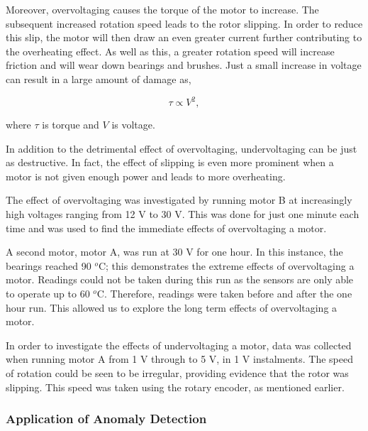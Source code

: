 Moreover, overvoltaging causes the torque of the motor to increase. The subsequent increased rotation speed leads to the rotor slipping. In order to reduce this slip, the motor will then draw an even greater current further contributing to the overheating effect. As well as this, a greater rotation speed will increase friction and will wear down bearings and brushes. Just a small increase in voltage can result in a large amount of damage as,

\begin{equation}
\tau \propto V^2,
\label{Torque}
\end{equation}

where $\tau$ is torque and $V$ is voltage.

In addition to the detrimental effect of overvoltaging, undervoltaging can be just as destructive. In fact, the effect of slipping is even more prominent when a motor is not given enough power and leads to more overheating.


The effect of overvoltaging  was investigated by running motor B at increasingly high voltages ranging from 12 V to 30 V. This was done for just one minute each time and was used to find the immediate effects of overvoltaging a motor.
    

A second motor, motor A, was run at 30 V for one hour. In this instance, the bearings reached 90 $^o$C; this demonstrates the extreme effects of overvoltaging a motor. Readings could not be taken during this run as the sensors are only able to operate %
up to 60 $^o$C. %
Therefore, readings were taken before and after the one hour run. This allowed us to explore the long term effects of overvoltaging a motor.


In order to investigate the effects of undervoltaging a motor, data was collected when running motor A from 1 V through to 5 V, in 1 V instalments. The speed of rotation could be seen to be irregular, providing evidence that the rotor was slipping. This speed was taken using the rotary encoder, as mentioned earlier. %


\subsubsection{Application of Anomaly Detection}

